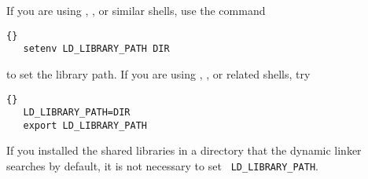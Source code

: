 If you are using , , or similar shells, use the command
\begin{lstlisting}{}
   setenv LD_LIBRARY_PATH DIR
\end{lstlisting}

\noindent to set the library path. If you are using , ,
or related shells, try

\begin{lstlisting}{}   
   LD_LIBRARY_PATH=DIR
   export LD_LIBRARY_PATH
\end{lstlisting}

If you installed the shared libraries in a directory that the dynamic linker
 searches by default, it is not necessary to set {\tt
LD\_LIBRARY\_PATH}.
